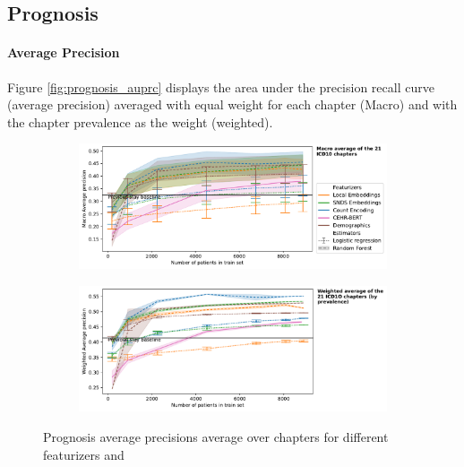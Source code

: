 \documentclass[french,12pt,twoside,a4paper]{book}
\begin{document}
\begin{appendices}
  \subsection{Prognosis}\label{apd:temporal_split:prognosis}

  \paragraph{Average Precision}

  Figure \ref{fig:prognosis_auprc} displays the area under the precision
  recall curve (average precision) averaged with equal weight for each chapter (Macro)
  and with the chapter prevalence as the weight (weighted).


  \begin{figure}[!h]
    \centering
    \begin{subfigure}[b]{1\textwidth}
      \caption{}\label{fig:prognosis_auprc_macro}
      \includegraphics[width=\linewidth]{img/chapter_3/prognosis/average_precision_score__c_macro.pdf}
    \end{subfigure}
    \vfill
    \begin{subfigure}[b]{1\textwidth}
      \caption{}\label{fig:prognosis_auprc_weighted}
      \includegraphics[width=\linewidth]{img/chapter_3/prognosis/average_precision_score__c_weighted.pdf}
    \end{subfigure}
    \caption{Prognosis average precisions average over chapters for different featurizers and
}
\end{figure}
\end{appendices}
\end{document}
